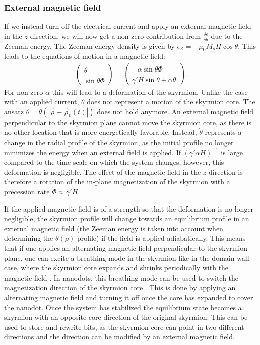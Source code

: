 \documentclass[12pt, a4paper, twoside, openright]{article}		%
\numberwithin{equation}{section}
\begin{document}
\subsubsection{External magnetic field}
If we instead turn off the electrical current and apply an external magnetic field in the $z$-direction, we will now get a non-zero contribution from $\frac{\delta\epsilon}{\delta\theta}$ due to the Zeeman energy. The Zeeman energy density is given by $\epsilon_Z = -\mu_0M_sH\cos\theta$. This leads to the equations of motion in a magnetic field:
\begin{align}
\begin{pmatrix}
\dot{\theta} \\ \sin\theta\dot{\Phi}
\end{pmatrix} =
\begin{pmatrix}
-\alpha \sin\theta\dot{\Phi} \\ \gamma' H\sin\theta + \alpha\dot{\theta}
\end{pmatrix}.
\label{eq:LLG_skyrmion_Hz}
\end{align}
For non-zero $\alpha$ this will lead to a deformation of the skyrmion. Unlike the case with an applied current, $\dot{\theta}$ does not represent a motion of the skyrmion core. The ansatz $\theta = \theta(|\vec{\rho}-\vec{\rho}_0(t)|)$ does not hold anymore. An external magnetic field perpendicular to the skyrmion plane cannot move the skyrmion core, as there is no other location that is more energetically favorable. Instead, $\dot{\theta}$ represents a change in the radial profile of the skyrmion, as the initial profile no longer minimizes the energy when an external field is applied. If $(\gamma'\alpha H)^{-1}$ is large compared to the time-scale on which the system changes, however, this deformation is negligible. The effect of the magnetic field in the $z$-direction is therefore a rotation of the in-plane magnetization of the skyrmion with a precession rate $\dot{\Phi} \approx \gamma'H$. 

If the applied magnetic field is of a strength so that the deformation is no longer negligible, the skyrmion profile will change towards an equilibrium profile in an external magnetic field (the Zeeman energy is taken into account when determining the $\theta (\rho)$ profile) if the field is applied adiabatically. This means that if one applies an alternating magnetic field perpendicular to the skyrmion plane, one can excite a breathing mode in the skyrmion like in the domain wall case, where the skyrmion core expands and shrinks periodically with the magnetic field \cite{Mochizuki2012}. In nanodots, this breathing mode can be used to switch the magnetization direction of the skyrmion core \cite{Zhang2015}. This is done by applying an alternating magnetic field and turning it off once the core has expanded to cover the nanodot. Once the system has stabilized the equilibrium state becomes a skyrmion with an opposite core direction of the original skyrmion. This can be used to store and rewrite bits, as the skyrmion core can point in two different directions and the direction can be modified by an external magnetic field. 
\end{document}
